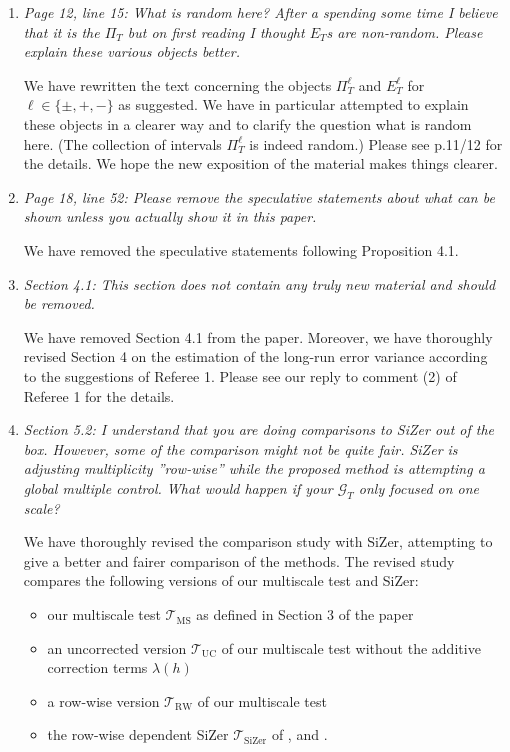 \documentclass[a4paper,12pt]{article}
\begin{document}
\begin{enumerate}[label=(\arabic*),leftmargin=0.7cm]
\item \textit{Page 12, line 15: What is random here? After a spending some time I believe that it is the $\Pi_T$ but on first reading I thought $E_T$s are non-random. Please explain these various objects better.}

We have rewritten the text concerning the objects $\Pi_T^\ell$ and $E_T^\ell$ for $\ell \in \{\pm,+,-\}$ as suggested. We have in particular attempted to explain these objects in a clearer way and to clarify the question what is random here. (The collection of intervals $\Pi_T^\ell$ is indeed random.) Please see p.11/12 for the details. We hope the new exposition of the material makes things clearer.  


\item \textit{Page 18, line 52: Please remove the speculative statements about what can be shown unless you actually show it in this paper.}

We have removed the speculative statements following Proposition 4.1.


\item \textit{Section 4.1: This section does not contain any truly new material and should be removed.}

We have removed Section 4.1 from the paper. Moreover, we have thoroughly revised Section 4 on the estimation of the long-run error variance according to the suggestions of Referee 1. Please see our reply to comment (2) of Referee 1 for the details. 


\item \textit{Section 5.2: I understand that you are doing comparisons to SiZer out of the box. However, some of the comparison might not be quite fair. SiZer is adjusting multiplicity ”row-wise” while the proposed method is attempting a global multiple control. What would happen if your $\mathcal{G}_T$ only focused on one scale?}

We have thoroughly revised the comparison study with SiZer, attempting to give a better and fairer comparison of the methods. The revised study compares the following versions of our multiscale test and SiZer: 
\begin{itemize}[leftmargin=0.5cm,itemsep=0cm]

\item our multiscale test $\mathcal{T}_{\text{MS}}$ as defined in Section 3 of the paper 
\item an uncorrected version $\mathcal{T}_{\text{UC}}$ of our multiscale test without the additive correction terms $\lambda(h)$ 
\item a row-wise version $\mathcal{T}_{\text{RW}}$ of our multiscale test 
\item the row-wise dependent SiZer $\mathcal{T}_{\text{SiZer}}$ of \cite{Rondonotti2004}, \cite{Rondonotti2007} and \cite{ParkHannigKang2009}. 


\end{itemize}
\end{enumerate}
\end{document}
